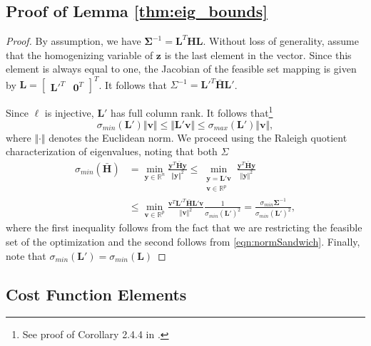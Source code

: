 \documentclass[lettersize,journal]{IEEEtran}
\begin{document}
\subsection{Proof of Lemma \ref{thm:eig_bounds}}\label{SM:lemma2Proof}

\begin{proof}
By assumption, we have $\bm{\Sigma}^{-1} = \bm{L}^T\bm{H}\bm{L}$. Without loss of generality, assume that the homogenizing variable of $\bm{z}$ is the last element in the vector. Since this element is always equal to one, the Jacobian of the feasible set mapping is given by $\bm{L} = \begin{bmatrix}
	\bm{L}'^T & \bm{0}^T
\end{bmatrix}^T$. It follows that ${\Sigma}^{-1} = \bm{L}'^T\bar{\bm{H}}\bm{L}'$.

Since $\bm{\ell}$ is injective, $\bm{L}'$ has full column rank. It follows that\footnote{See proof of Corollary 2.4.4 in \cite{golubMatrixComputations2013}.}
\begin{equation}\label{eqn:normSandwich}
	\sigma_{min}(\bm{L}') \Vert\bm{v}\Vert \leq  \Vert\bm{L}'\bm{v}\Vert \leq \sigma_{max}(\bm{L}')\Vert\bm{v}\Vert,
\end{equation}
where $\Vert\cdot\Vert$ denotes the Euclidean norm. We proceed using the Raleigh quotient characterization of eigenvalues, noting that both $\Sigma$
\begin{align*}
	\sigma_{min}(\bar{\bm{H}}) &= \min\limits_{\bm{y}\in\mathbb{R}^n} \frac{\bm{y}^T \bar{\bm{H}} \bm{y}}{\Vert\bm{y}\Vert^2} 
	\leq \min\limits_{\substack{\bm{y}=\bm{L}'\bm{v}\\\bm{v}\in\mathbb{R}^p}} \frac{\bm{y}^T \bar{\bm{H}} \bm{y}}{\Vert\bm{y}\Vert^2} \\ 
	&\leq \min\limits_{\bm{v}\in\mathbb{R}^p} \frac{\bm{v}^T \bm{L}'^T\bar{\bm{H}}\bm{L}' \bm{v}}{\Vert\bm{v}\Vert^2 } \frac{1}{\sigma_{min}(\bm{L}')^2} 
	= \frac{\sigma_{min}{\bm{\Sigma}^{-1}}}{\sigma_{min}(\bm{L}')^2},
\end{align*}
where the first inequality follows from the fact that we are restricting the feasible set of the optimization and the second follows from \eqref{eqn:normSandwich}. Finally, note that $\sigma_{min}(\bm{L}') = \sigma_{min}(\bm{L})$

\end{proof}

\subsection{Cost Function Elements}\label{SM:LocCost}
\end{document}
